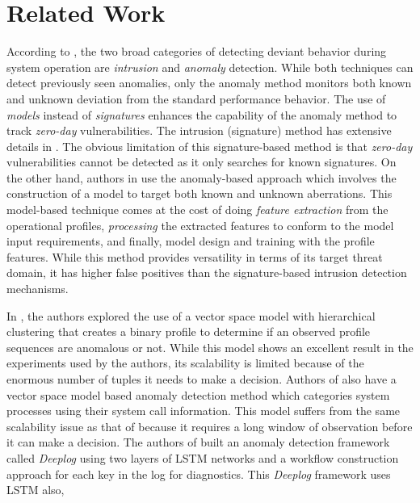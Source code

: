 \section{Related Work}
\label{sec:related-work}
According to \cite{chandola2009anomaly}, the two broad categories of detecting 
deviant behavior during system operation are \emph{intrusion} and 
\emph{anomaly} detection. While both techniques can detect previously seen 
anomalies, only the anomaly method monitors both known and unknown deviation 
from the standard performance behavior. The use of \emph{models} instead of 
\emph{signatures} enhances the capability of the anomaly method to track 
\emph{zero-day} vulnerabilities. The intrusion (signature) method has extensive 
details in \cite{garcia2009anomaly}. The obvious limitation of this 
signature-based method is that \emph{zero-day} vulnerabilities cannot be 
detected as it only searches for known signatures. On the other hand, authors 
in \cite{Ezeme2017,du2017deeplog,xu2009largescale,yu2016cloudseer} use the 
anomaly-based approach which involves the construction of a model to target 
both known and unknown aberrations. This model-based technique comes at the 
cost of doing \emph{feature extraction} from the operational profiles, 
\emph{processing} the extracted features to conform to the model input 
requirements, and finally, model design and training with the profile features. 
While this method provides versatility in terms of its target threat domain, it 
has higher false positives than the signature-based intrusion detection 
mechanisms.\par 
In \cite{Ezeme2017}, the authors explored the use of a vector space model with 
hierarchical clustering that creates a binary profile to determine if an 
observed profile sequences are anomalous or not. While this model shows an 
excellent result in the experiments used by the authors, its scalability is 
limited because of the enormous number of tuples it needs to make a decision. 
Authors of \cite{yoon2017learning} also have a vector space model based anomaly 
detection method which categories system processes using their system call 
information. This model suffers from the same scalability issue as that of 
\cite{Ezeme2017} because it requires a long window of observation before it can 
make a decision. The authors of \cite{du2017deeplog} built an anomaly detection 
framework called \emph{Deeplog} using two layers of LSTM networks and a 
workflow construction approach for each 
key in the log for diagnostics. This \emph{Deeplog} framework uses LSTM also, 
